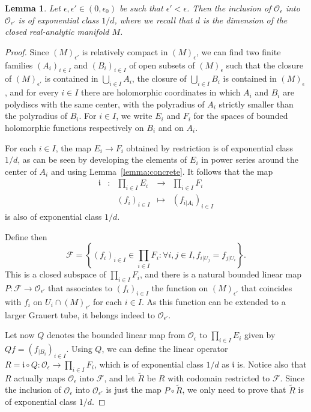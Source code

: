 \documentclass[10pt]{amsart}
\newtheorem{lemm}[theo]{Lemma}\newtheorem{prop}[theo]{Proposition}\newtheorem{coro}[theo]{Corollary}\newtheorem{conj}[theo]{Conjecture}
\theoremstyle{definition}\newtheorem{defi}[theo]{Definition}\newtheorem{rema}[theo]{Remark}\newtheorem{exam}[theo]{Example}\newtheorem{exem}[theo]{Example}\newtheorem{nota}[theo]{Notation}
\newcommand{\set}[1]{\left\{ #1 \right\}}
\newcommand{\clO}{\mathcal{O}}
\newcommand{\clF}{\mathcal{F}}
\newcommand{\fki}{\mathfrak{i}}
\let\oldforall\forall
\renewcommand*{\forall}{\mathrel{\oldforall}}
\begin{document}
\begin{lemm}\label{lemma:exponential_inclusion}
Let $\epsilon,\epsilon' \in (0,\epsilon_0)$ be such that $\epsilon' < \epsilon$. Then the inclusion of $\clO_\epsilon$ into $\clO_{\epsilon'}$ is of exponential class $1/d$, where we recall that $d$ is the dimension of the closed real-analytic manifold $M$.
\end{lemm}

\begin{proof}
Since $(M)_{\epsilon'}$ is relatively compact in $(M)_\epsilon$, we can find two finite families $(A_i)_{i \in I}$ and $(B_i)_{i \in I}$ of open subsets of $(M)_\epsilon$ such that the closure of $(M)_{\epsilon'}$ is contained in $\bigcup_{i \in I} A_i$, the closure of $\bigcup_{i \in I} B_i$ is contained in $(M)_\epsilon$, and for every $i \in I$ there are holomorphic coordinates in which $A_i$ and $B_i$ are polydiscs with the same center, with the polyradius of $A_i$ strictly smaller than the polyradius of $B_i$. For $i \in I$, we write $E_i$ and $F_i$ for the spaces of bounded holomorphic functions respectively on $B_i$ and on $A_i$.

For each $i \in I$, the map $E_i \to F_i$ obtained by restriction is of exponential class $1/d$, as can be seen by developing the elements of $E_i$ in power series around the center of $A_i$ and using Lemma~\ref{lemma:concrete}. It follows that the map
\begin{equation*}
\begin{array}{ccccc}
\fki & : & \prod_{i \in I} E_i& \to & \prod_{i \in I} F_i \\
& & (f_i)_{i \in I} & \mapsto & (f_{i|A_i})_{i \in I}
\end{array}
\end{equation*}
is also of exponential class $1/d$.

Define then
\begin{equation*}
\clF = \set{ (f_i)_{i \in I} \in \prod_{i \in I} F_i: \forall i,j \in I, f_{i|U_j} = f_{j|U_i}}.
\end{equation*}
This is a closed subspace of $\prod_{i \in I} F_i$, and there is a natural bounded linear map $P : \clF \to \clO_{\epsilon'}$ that associates to $(f_i)_{i \in I}$ the function on $(M)_{\epsilon'}$ that coincides with $f_i$ on $U_i \cap(M)_{\epsilon'}$ for each $i \in I$. As this function can be extended to a larger Grauert tube, it belongs indeed to $\clO_{\epsilon'}$.

Let now $Q$ denotes the bounded linear map from $\clO_{\epsilon}$ to $\prod_{i \in I} E_i$ given by $Qf = (f_{|B_i})_{i \in I}$. Using $Q$, we can define the linear operator $R = \fki \circ Q : \clO_\epsilon \to \prod_{i \in I} F_i$, which is of exponential class $1/d$ as $\fki $ is. Notice also that $R$ actually maps $\clO_\epsilon$ into $\clF$, and let $\widetilde{R}$ be $R$ with codomain restricted to $\clF$. Since the inclusion of $\clO_\epsilon$ into $\clO_{\epsilon'}$ is just the map $P \circ \widetilde{R}$, we only need to prove that $\widetilde{R}$ is of exponential class $1/d$.


\end{proof}
\end{document}
